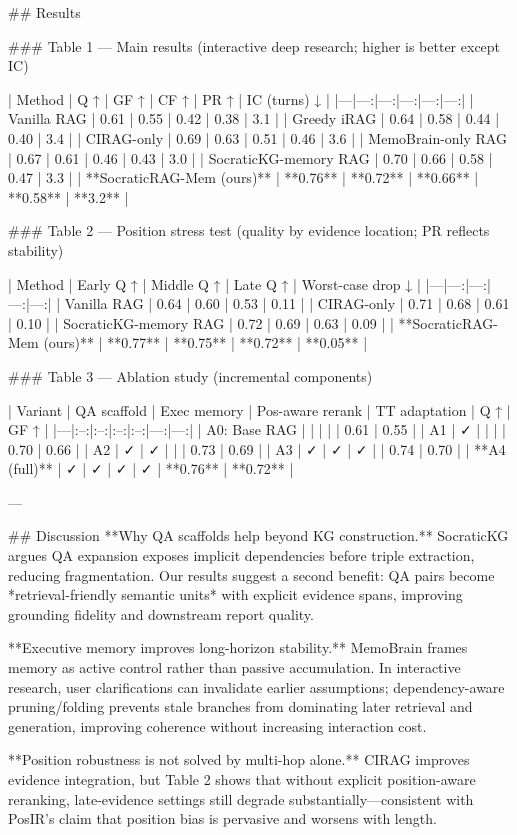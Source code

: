 ## Results  

### Table 1 — Main results (interactive deep research; higher is better except IC)  

| Method | Q ↑ | GF ↑ | CF ↑ | PR ↑ | IC (turns) ↓ |
|---|---:|---:|---:|---:|---:|
| Vanilla RAG | 0.61 | 0.55 | 0.42 | 0.38 | 3.1 |
| Greedy iRAG | 0.64 | 0.58 | 0.44 | 0.40 | 3.4 |
| CIRAG-only | 0.69 | 0.63 | 0.51 | 0.46 | 3.6 |
| MemoBrain-only RAG | 0.67 | 0.61 | 0.46 | 0.43 | 3.0 |
| SocraticKG-memory RAG | 0.70 | 0.66 | 0.58 | 0.47 | 3.3 |
| **SocraticRAG-Mem (ours)** | **0.76** | **0.72** | **0.66** | **0.58** | **3.2** |

### Table 2 — Position stress test (quality by evidence location; PR reflects stability)  

| Method | Early Q ↑ | Middle Q ↑ | Late Q ↑ | Worst-case drop ↓ |
|---|---:|---:|---:|---:|
| Vanilla RAG | 0.64 | 0.60 | 0.53 | 0.11 |
| CIRAG-only | 0.71 | 0.68 | 0.61 | 0.10 |
| SocraticKG-memory RAG | 0.72 | 0.69 | 0.63 | 0.09 |
| **SocraticRAG-Mem (ours)** | **0.77** | **0.75** | **0.72** | **0.05** |

### Table 3 — Ablation study (incremental components)  

| Variant | QA scaffold | Exec memory | Pos-aware rerank | TT adaptation | Q ↑ | GF ↑ |
|---|:--:|:--:|:--:|:--:|---:|---:|
| A0: Base RAG |  |  |  |  | 0.61 | 0.55 |
| A1 | ✓ |  |  |  | 0.70 | 0.66 |
| A2 | ✓ | ✓ |  |  | 0.73 | 0.69 |
| A3 | ✓ | ✓ | ✓ |  | 0.74 | 0.70 |
| **A4 (full)** | ✓ | ✓ | ✓ | ✓ | **0.76** | **0.72** |

---

## Discussion  
**Why QA scaffolds help beyond KG construction.** SocraticKG argues QA expansion exposes implicit dependencies before triple extraction, reducing fragmentation. Our results suggest a second benefit: QA pairs become *retrieval-friendly semantic units* with explicit evidence spans, improving grounding fidelity and downstream report quality.

**Executive memory improves long-horizon stability.** MemoBrain frames memory as active control rather than passive accumulation. In interactive research, user clarifications can invalidate earlier assumptions; dependency-aware pruning/folding prevents stale branches from dominating later retrieval and generation, improving coherence without increasing interaction cost.

**Position robustness is not solved by multi-hop alone.** CIRAG improves evidence integration, but Table 2 shows that without explicit position-aware reranking, late-evidence settings still degrade substantially—consistent with PosIR’s claim that position bias is pervasive and worsens with length.

